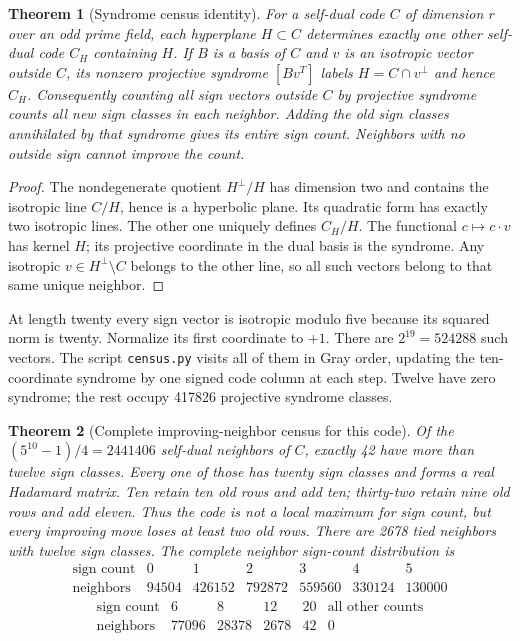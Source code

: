 \documentclass[11pt]{article}
\newtheorem{theorem}{Theorem}[section]
\begin{document}
\begin{theorem}[Syndrome census identity]
For a self-dual code $C$ of dimension $r$ over an odd prime field,
each hyperplane $H\subset C$ determines exactly one other self-dual
code $C_H$ containing $H$. If $B$ is a basis of $C$ and $v$ is an
isotropic vector outside $C$, its nonzero projective syndrome
$[Bv^T]$ labels $H=C\cap v^\perp$ and hence $C_H$.
Consequently counting all sign vectors outside $C$ by projective
syndrome counts all new sign classes in each neighbor. Adding the
old sign classes annihilated by that syndrome gives its entire
sign count. Neighbors with no outside sign cannot improve the count.
\end{theorem}
\begin{proof}
The nondegenerate quotient $H^\perp/H$ has dimension two and contains
the isotropic line $C/H$, hence is a hyperbolic plane. Its quadratic
form has exactly two isotropic lines. The other one uniquely defines
$C_H/H$. The functional $c\mapsto c\cdot v$ has kernel $H$;
its projective coordinate in the dual basis is the syndrome.
Any isotropic $v\in H^\perp\setminus C$ belongs to the other line,
so all such vectors belong to that same unique neighbor.
\end{proof}
At length twenty every sign vector is isotropic modulo five because
its squared norm is twenty. Normalize its first coordinate to $+1$.
There are $2^{19}=524288$ such vectors. The script \texttt{census.py}
visits all of them in Gray order, updating the ten-coordinate
syndrome by one signed code column at each step. Twelve have zero
syndrome; the rest occupy 417826 projective syndrome classes.

\begin{theorem}[Complete improving-neighbor census for this code]
Of the $(5^{10}-1)/4=2441406$ self-dual neighbors of $C$, exactly
42 have more than twelve sign classes. Every one of those has
twenty sign classes and forms a real Hadamard matrix. Ten retain
ten old rows and add ten; thirty-two retain nine old rows and add
eleven. Thus the code is not a local maximum for sign count, but
every improving move loses at least two old rows.
There are 2678 tied neighbors with twelve sign classes.
The complete neighbor sign-count distribution is
\[
\begin{array}{c|rrrrrr}
\text{sign count}&0&1&2&3&4&5\\\hline
\text{neighbors}&94504&426152&792872&559560&330124&130000
\end{array}
\]
\[
\begin{array}{c|rrrrr}
\text{sign count}&6&8&12&20&\text{all other counts}\\\hline
\text{neighbors}&77096&28378&2678&42&0
\end{array}
\]
\end{theorem}
\end{document}
